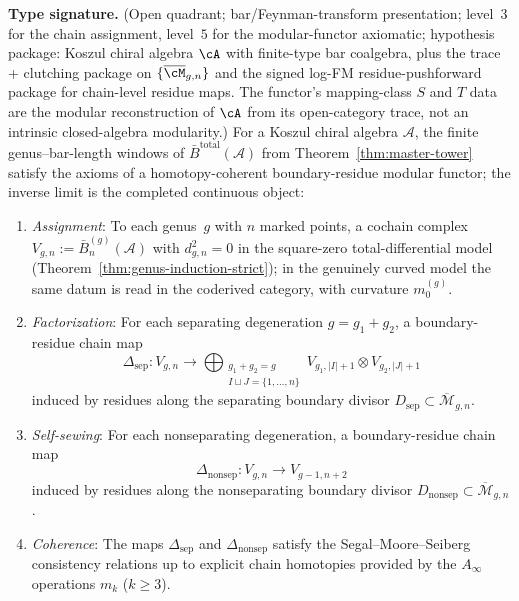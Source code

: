 \begin{theorem}\label{thm:chain-modular-functor}
\textbf{Type signature.} (Open quadrant; bar/Feynman-transform
presentation; level~$3$ for the chain assignment, level~$5$ for the
modular-functor axiomatic; hypothesis package: Koszul chiral algebra
$\cA$ with finite-type bar coalgebra, plus the trace + clutching
package on $\{\overline{\cM}_{g,n}\}$ and the signed log-FM
residue-pushforward package for chain-level residue maps. The functor's mapping-class
$S$ and $T$ data are the modular reconstruction of $\cA$ from its
open-category trace, not an intrinsic closed-algebra modularity.)
For a Koszul chiral algebra $\mathcal{A}$, the finite
genus--bar-length windows of
$\bar{B}^{\mathrm{total}}(\mathcal{A})$ from
Theorem~\ref{thm:master-tower} satisfy the axioms of a
homotopy-coherent boundary-residue modular functor; the inverse limit
is the completed continuous object:
\begin{enumerate}[label=\textup{(\roman*)}]
\item \emph{Assignment}: To each genus~$g$ with $n$ marked points,
 a cochain complex $V_{g,n} := \bar{B}^{(g)}_n(\mathcal{A})$
 with $d_{g,n}^2 = 0$
 in the square-zero total-differential model
 \textup{(}Theorem~\textup{\ref{thm:genus-induction-strict})}; in the
 genuinely curved model the same datum is read in the coderived
 category, with curvature $m_0^{(g)}$.
\item \emph{Factorization}: For each separating degeneration
 $g = g_1 + g_2$, a boundary-residue chain map
 \begin{equation}\label{eq:factorization-map}
 \Delta_{\mathrm{sep}}: V_{g,n} \to
 \bigoplus_{\substack{g_1+g_2=g \\ I \sqcup J = \{1,\ldots,n\}}}
 V_{g_1,|I|+1} \otimes V_{g_2,|J|+1}
 \end{equation}
 induced by residues along the separating boundary divisor
 $D_{\mathrm{sep}} \subset \overline{\mathcal{M}}_{g,n}$.
\item \emph{Self-sewing}: For each nonseparating degeneration, a boundary-residue chain map
 \begin{equation}\label{eq:self-sewing-map}
 \Delta_{\mathrm{nonsep}}: V_{g,n} \to V_{g-1,n+2}
 \end{equation}
 induced by residues along the nonseparating boundary divisor
 $D_{\mathrm{nonsep}} \subset \overline{\mathcal{M}}_{g,n}$.
\item \emph{Coherence}: The maps $\Delta_{\mathrm{sep}}$ and
 $\Delta_{\mathrm{nonsep}}$ satisfy the Segal--Moore--Seiberg
 consistency relations up to explicit chain homotopies
 provided by the $A_\infty$ operations $m_k$ ($k \geq 3$).
\end{enumerate}
\end{theorem}

